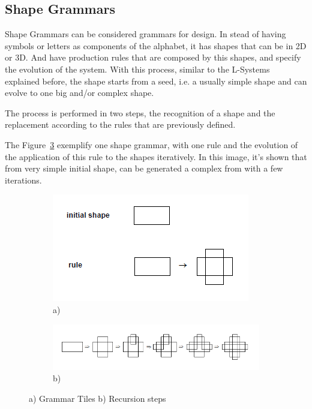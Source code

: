 
\subsection{Shape Grammars} %
\label{ssub:shape_grammars}


Shape Grammars can be considered grammars for design. In stead of having symbols or letters as components of the alphabet, it has shapes that can be in 2D or 3D. And have production rules that are composed by this shapes, and specify the evolution of the system. With this process, similar to the L-Systems explained before, the shape starts from a seed, i.e. a usually simple shape and can evolve to one big and/or complex shape.

The process is performed in two steps, the recognition of a shape and the replacement according to the rules that are previously defined. 

The Figure~\ref{fig:SGrammars} exemplify one shape grammar, with one rule and the evolution of the application of this rule to the shapes iteratively. In this image, it's shown that from very simple initial shape, can be generated a complex from with a few iterations.

\begin{figure}
        \centering
		\begin{subfigure}[b]{0.55\textwidth}
			\includegraphics[width=\textwidth]{img/Theory/Shape_Grammars/Grammar.png}
			\caption{a)}
			\label{fig:SGGrammar}
		\end{subfigure}
        
		\begin{subfigure}[b]{0.55\textwidth}
			\includegraphics[width=\textwidth]{img/Theory/Shape_Grammars/Recursion.png}
			\caption{b)}
			\label{fig:SGRecursion}
		\end{subfigure}
        \caption{a) Grammar Tiles b) Recursion steps}
        \label{fig:SGrammars}
\end{figure}


